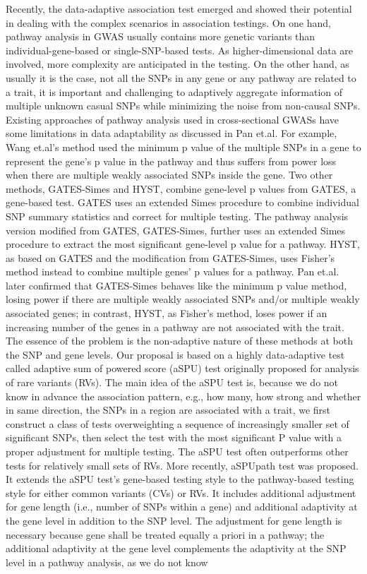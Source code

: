 \documentclass[12pt]{article}
\begin{document}
Recently, the data-adaptive association test emerged and showed their potential in dealing with the complex scenarios in association testings.\cite{Pan2015,pan2014powerful} On one hand, pathway analysis in GWAS usually contains more genetic variants than individual-gene-based or single-SNP-based tests. As higher-dimensional data are involved, more complexity are anticipated in the testing. On the other hand, as usually it is the case, not all the SNPs in any gene or any pathway are related to a trait, it is important and challenging to adaptively aggregate information of multiple unknown casual SNPs while minimizing the noise from non-causal SNPs. Existing approaches of pathway analysis used in cross-sectional GWASs have some limitations in data adaptability as discussed in Pan et.al.\cite{Pan2015} For example, Wang et.al's method\cite{wang2007pathway} used the minimum p value of the multiple SNPs in a gene to represent the gene's p value in the pathway and thus suffers from power loss when there are multiple weakly associated SNPs inside the gene. Two other methods, GATES-Simes\cite{Gui2011} and HYST,\cite{Li2012} combine gene-level p values from GATES,\cite{Li2011} a gene-based test. GATES uses an extended Simes procedure to combine individual SNP summary statistics and correct for multiple testing. The pathway analysis version modified from GATES, GATES-Simes, further uses an extended Simes procedure to extract the most significant gene-level p value for a pathway. HYST, as based on GATES and the modification from GATES-Simes, uses Fisher's method instead to combine multiple genes' p values for a pathway. Pan et.al. later confirmed that GATES-Simes behaves like the minimum p value method, losing power if there are multiple weakly associated SNPs and/or multiple weakly associated genes; in contrast, HYST, as Fisher's method, loses power if an increasing number of the genes in a pathway are not associated with the trait. The essence of the problem is the non-adaptive nature of these methods at both the SNP and gene levels. Our proposal is based on a highly data-adaptive test called adaptive sum of powered score (aSPU) test originally proposed for analysis of rare variants (RVs).\cite{pan2014powerful} The main idea of the aSPU test is, because we do not know in advance the association pattern, e.g., how many, how strong and whether in same direction, the SNPs in a region are associated with a trait, we first construct a class of tests overweighting a sequence of increasingly smaller set of significant SNPs, then select the test with the most significant P value with a proper adjustment for multiple testing. The aSPU test often outperforms other tests for relatively small sets of RVs.\cite{pan2014powerful}  More recently, aSPUpath test\cite{Pan2015} was proposed. It extends the aSPU test's gene-based testing style to the pathway-based testing style for either common variants (CVs) or RVs. It includes additional adjustment for gene length (i.e., number of SNPs within a gene) and additional adaptivity at the gene level in addition to the SNP level. The adjustment for gene length is necessary because gene shall be treated equally a priori in a pathway; the additional adaptivity at the gene level complements the adaptivity at the SNP level in a pathway analysis, as we do not know 
\end{document}

